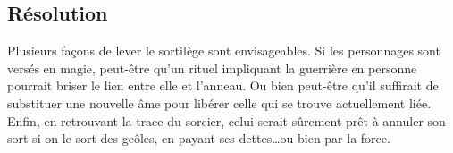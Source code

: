 \documentclass[a5paper,pagesize,10pt,bibliography=totoc,numbers=noenddot,
headings=normal,DIV=9,twoside=false]{scrbook}
\begin{document}
\subsection*{Résolution}

Plusieurs façons de lever le sortilège sont envisageables.
Si les personnages sont versés en magie, peut-être qu'un rituel impliquant la guerrière en personne pourrait briser le lien entre elle et l'anneau.
Ou bien peut-être qu'il suffirait de substituer une nouvelle âme pour libérer celle qui se trouve actuellement liée.
Enfin, en retrouvant la trace du sorcier, celui serait sûrement prêt à annuler son sort si on le sort des geôles, en payant ses dettes\dots ou bien par la force.













\end{document}
